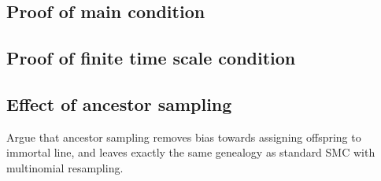 \subsection{Proof of main condition}

\subsection{Proof of finite time scale condition}

\subsection{Effect of ancestor sampling}
Argue that ancestor sampling removes bias towards assigning offspring to immortal line, and leaves exactly the same genealogy as standard SMC with multinomial resampling.